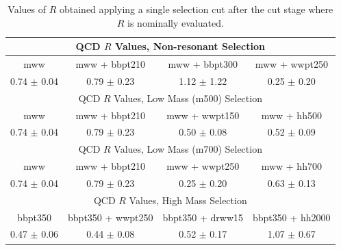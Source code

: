 \begin{table}[h!]
\centering

\begin{tabular}{c|c|c|c}
\hline\hline



\multicolumn{4}{c}{QCD $R$ Values, Non-resonant Selection}\\\hline\hline
mww 	                & mww + bbpt210 	& mww + bbpt300 	& mww + wwpt250 	\\\hline 
0.74 $\pm$ 0.04 	& 0.79 $\pm$ 0.23 	& 1.12 $\pm$ 1.22 	& 0.25 $\pm$ 0.20 	\\\hline \hline
\multicolumn{4}{c}{QCD $R$ Values, Low Mass (m500) Selection}\\\hline\hline
mww 	                & mww + bbpt210 	& mww + wwpt150 	& mww + hh500	  \\\hline 
0.74 $\pm$ 0.04 	& 0.79 $\pm$ 0.23 	& 0.50 $\pm$ 0.08 	& 0.52 $\pm$ 0.09  \\\hline \hline
\multicolumn{4}{c}{QCD $R$ Values, Low Mass (m700) Selection}\\\hline\hline
mww 	                & mww + bbpt210 	& mww + wwpt250 	& mww + hh700	  \\\hline 
0.74 $\pm$ 0.04 	& 0.79 $\pm$ 0.23 	& 0.25 $\pm$ 0.20 	& 0.63 $\pm$ 0.13  \\\hline \hline
\multicolumn{4}{c}{QCD $R$ Values, High Mass Selection}\\\hline\hline
bbpt350 	        & bbpt350 + wwpt250 	& bbpt350 + drww15 	& bbpt350 + hh2000	\\\hline 
0.47 $\pm$ 0.06 	& 0.44 $\pm$ 0.08 	& 0.52 $\pm$ 0.17	& 1.07 $\pm$ 0.67 	\\\hline 

\hline\hline
\end{tabular}

\caption[Cross check for coorelation with R]{Values of $R$ obtained applying a single selection cut after the cut stage where $R$ is nominally evaluated.} \label{tab:R_after_X}
\end{table}


